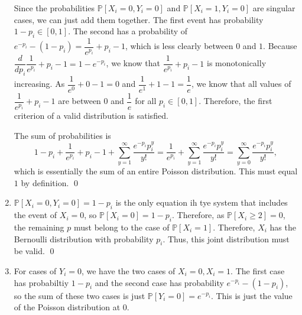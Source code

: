 \documentclass{article}
\newcommand{\p}{\mathbb{P}}
\begin{document}
\begin{enumerate}[label=(\alph*)]
	Since the probabilities $\p[X_i = 0, Y_i = 0]$ and $\p[X_i = 1, Y_i = 0]$ are singular cases, we can just add them together. The first event has probability $1 - p_i \in [0, 1]$. The second has a probability of $e^{-p_i} - (1 - p_i) = \dfrac{1}{e^{p_i}} + p_i - 1$, which is less clearly between $0$ and $1$. Because $\dfrac{d}{dp_i} \dfrac{1}{e^{p_i}} + p_i - 1 = 1-e^{-p_i}$, we know that $\dfrac{1}{e^{p_i}} + p_i - 1$ is monotonically increasing. As $\dfrac{1}{e^{0}} + 0 - 1 = 0$ and $\dfrac{1}{e^{1}} + 1 - 1 = \dfrac{1}{e}$, we know that all values of $\dfrac{1}{e^{p_i}} + p_i - 1$ are between $0$ and $\dfrac{1}{e}$ for all $p_i \in [0,1]$. Therefore, the first criterion of a valid distribution is satisfied.

	The sum of probabilities is 
	\[1-p_i + \dfrac{1}{e^{p_i}} + p_i - 1 + \sum_{y=1}^\infty \dfrac{e^{-p_i}p_i^y}{y!} = \dfrac{1}{e^{p_i}} + \sum_{y=1}^\infty \dfrac{e^{-p_i}p_i^y}{y!} = \sum_{y=0}^\infty \dfrac{e^{-p_i}p_i^y}{y!},\]
	which is essentially the sum of an entire Poisson distribution. This must equal $1$ by definition. \qed
	\item $\p[X_i = 0, Y_i = 0] = 1 - p_i$ is the only equation ih tye system that includes the event of $X_i = 0$, so $\p[X_i = 0] = 1 - p_i$. Therefore, as $\p[X_i \geq 2] = 0$, the remaining $p$ must belong to the case of $\p[X_i = 1]$. Therefore, $X_i$ has the Bernoulli distribution with probability $p_i$. Thus, this joint distribution must be valid. \qed 
	\item For cases of $Y_i = 0$, we have the two cases of $X_i = 0, X_i = 1$. The first case has probabiltiy $1-p_i$ and the second case has probability $e^{-p_i} - (1-p_i)$, so the sum of these two cases is just $\p[Y_i = 0] = e^{-p_i}$. This is just the value of the Poisson distribution at 0. 
	

\end{enumerate}
\end{document}
